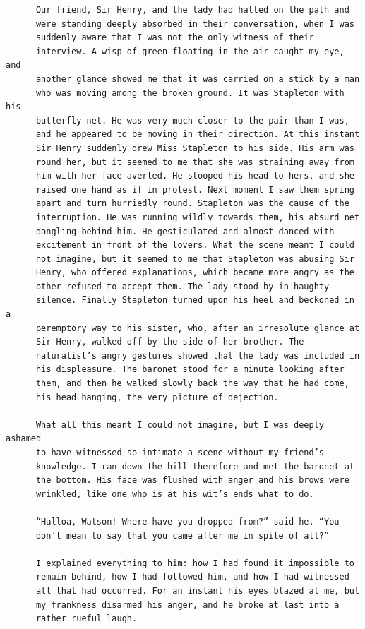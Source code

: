 \documentclass{article}
\begin{document}
\begin{verbatim}
      Our friend, Sir Henry, and the lady had halted on the path and
      were standing deeply absorbed in their conversation, when I was
      suddenly aware that I was not the only witness of their
      interview. A wisp of green floating in the air caught my eye, and
      another glance showed me that it was carried on a stick by a man
      who was moving among the broken ground. It was Stapleton with his
      butterfly-net. He was very much closer to the pair than I was,
      and he appeared to be moving in their direction. At this instant
      Sir Henry suddenly drew Miss Stapleton to his side. His arm was
      round her, but it seemed to me that she was straining away from
      him with her face averted. He stooped his head to hers, and she
      raised one hand as if in protest. Next moment I saw them spring
      apart and turn hurriedly round. Stapleton was the cause of the
      interruption. He was running wildly towards them, his absurd net
      dangling behind him. He gesticulated and almost danced with
      excitement in front of the lovers. What the scene meant I could
      not imagine, but it seemed to me that Stapleton was abusing Sir
      Henry, who offered explanations, which became more angry as the
      other refused to accept them. The lady stood by in haughty
      silence. Finally Stapleton turned upon his heel and beckoned in a
      peremptory way to his sister, who, after an irresolute glance at
      Sir Henry, walked off by the side of her brother. The
      naturalist’s angry gestures showed that the lady was included in
      his displeasure. The baronet stood for a minute looking after
      them, and then he walked slowly back the way that he had come,
      his head hanging, the very picture of dejection.

      What all this meant I could not imagine, but I was deeply ashamed
      to have witnessed so intimate a scene without my friend’s
      knowledge. I ran down the hill therefore and met the baronet at
      the bottom. His face was flushed with anger and his brows were
      wrinkled, like one who is at his wit’s ends what to do.

      “Halloa, Watson! Where have you dropped from?” said he. “You
      don’t mean to say that you came after me in spite of all?”

      I explained everything to him: how I had found it impossible to
      remain behind, how I had followed him, and how I had witnessed
      all that had occurred. For an instant his eyes blazed at me, but
      my frankness disarmed his anger, and he broke at last into a
      rather rueful laugh.


\end{verbatim}
\end{document}
